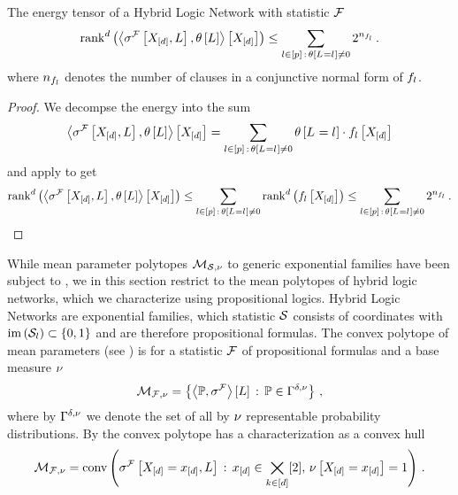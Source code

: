 \begin{corollary}
	The energy tensor of a Hybrid Logic Network with statistic $\mathcal{F}$
	\begin{align*}
		\mathrm{rank}^{d}\left(\left\langle \sigma^{\mathcal{F}}\left[X_{[d]},L\right],\theta\left[L\right]\right\rangle \left[ X_{[d]} \right]\right) \leq \sum_{l\in[p]\,:\,\theta\left[L_{}=l_{}\right]\neq0} 2^{n_{f_{l}}} \, .
	\end{align*}
	where $n_{f_{l}}$ denotes the number of clauses in a conjunctive normal form of $f_{l}$.
\end{corollary}
\begin{proof}
	We decompse the energy into the sum
	\begin{align*}
		\left\langle \sigma^{\mathcal{F}}\left[X_{[d]},L\right],\theta\left[L\right]\right\rangle \left[ X_{[d]} \right]
		= \sum_{l\in[p]\,:\,\theta\left[L_{}=l_{}\right]\neq0} \theta\left[L_{}=l_{}\right] \cdot f_{l}\left[X_{[d]}\right]
	\end{align*}
	and apply  to get
	\begin{align*}
		\mathrm{rank}^{d}\left(\left\langle \sigma^{\mathcal{F}}\left[X_{[d]},L\right],\theta\left[L\right]\right\rangle \left[ X_{[d]} \right]\right)
		\leq \sum_{l\in[p]\,:\,\theta\left[L_{}=l_{}\right]\neq0} \mathrm{rank}^{d}\left(f_{l}\left[X_{[d]}\right]\right)
		\leq \sum_{l\in[p]\,:\,\theta\left[L_{}=l_{}\right]\neq0}2^{n_{f_{l}}} \, .
	\end{align*}
\end{proof}



While mean parameter polytopes $\mathcal{M}_{\mathcal{S},\nu}$ to generic exponential families have been subject to , we in this section restrict to the mean polytopes of hybrid logic networks, which we characterize using propositional logics.
Hybrid Logic Networks are exponential families, which statistic $\mathcal{S}$ consists of coordinates with $\mathrm{im}\left(\mathcal{S}_{l}\right)\subset\{0,1\}$ and are therefore propositional formulas.
The convex polytope of mean parameters (see ) is for a statistic $\mathcal{F}$ of propositional formulas and a base measure $\nu$
\begin{align*}
	\mathcal{M}_{\mathcal{F},\nu} = \left\{ \left\langle \mathbb{P},\sigma^{\mathcal{F}}\right\rangle \left[ L \right] \, : \, \mathbb{P}\in\Gamma^{\delta,\nu} \right\} \, ,
\end{align*}
where by $\Gamma^{\delta,\nu}$ we denote the set of all by $\nu$ representable probability distributions.
By  the convex polytope has a characterization as a convex hull
\begin{align}\label{eq:hlnMeansetConvCharacterization}
	\mathcal{M}_{\mathcal{F},\nu}
	= \mathrm{conv}\left(\sigma^{\mathcal{F}}\left[X_{[d]}=x_{[d]},L\right] \, : \, x_{[d]}\in\bigtimes_{k\in[d]}[2], \, \nu\left[X_{[d]}=x_{[d]}\right]=1\right) \, .
\end{align}

